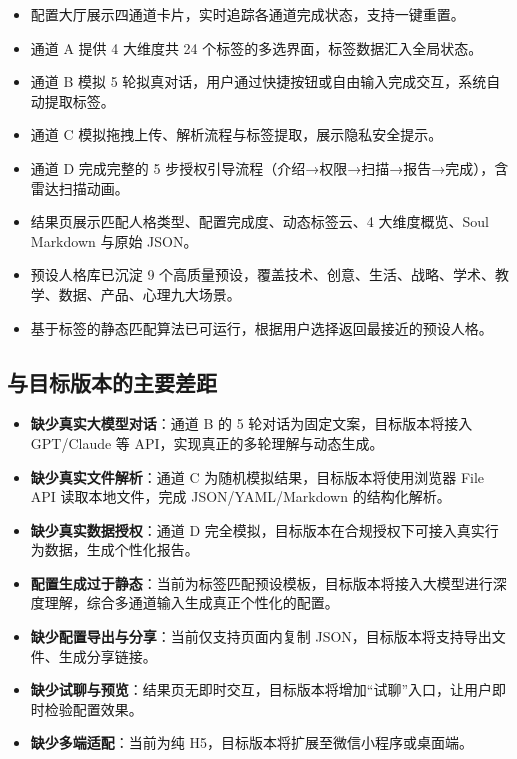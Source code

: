 \documentclass[11pt,a4paper]{ctexart}
\begin{document}
\begin{itemize}
  \item 配置大厅展示四通道卡片，实时追踪各通道完成状态，支持一键重置。
  \item 通道 A 提供 4 大维度共 24 个标签的多选界面，标签数据汇入全局状态。
  \item 通道 B 模拟 5 轮拟真对话，用户通过快捷按钮或自由输入完成交互，系统自动提取标签。
  \item 通道 C 模拟拖拽上传、解析流程与标签提取，展示隐私安全提示。
  \item 通道 D 完成完整的 5 步授权引导流程（介绍→权限→扫描→报告→完成），含雷达扫描动画。
  \item 结果页展示匹配人格类型、配置完成度、动态标签云、4 大维度概览、Soul Markdown 与原始 JSON。
  \item 预设人格库已沉淀 9 个高质量预设，覆盖技术、创意、生活、战略、学术、教学、数据、产品、心理九大场景。
  \item 基于标签的静态匹配算法已可运行，根据用户选择返回最接近的预设人格。
\end{itemize}

\subsection{与目标版本的主要差距}

\begin{itemize}
  \item \textbf{缺少真实大模型对话}：通道 B 的 5 轮对话为固定文案，目标版本将接入 GPT/Claude 等 API，实现真正的多轮理解与动态生成。
  \item \textbf{缺少真实文件解析}：通道 C 为随机模拟结果，目标版本将使用浏览器 File API 读取本地文件，完成 JSON/YAML/Markdown 的结构化解析。
  \item \textbf{缺少真实数据授权}：通道 D 完全模拟，目标版本在合规授权下可接入真实行为数据，生成个性化报告。
  \item \textbf{配置生成过于静态}：当前为标签匹配预设模板，目标版本将接入大模型进行深度理解，综合多通道输入生成真正个性化的配置。
  \item \textbf{缺少配置导出与分享}：当前仅支持页面内复制 JSON，目标版本将支持导出文件、生成分享链接。
  \item \textbf{缺少试聊与预览}：结果页无即时交互，目标版本将增加“试聊”入口，让用户即时检验配置效果。
  \item \textbf{缺少多端适配}：当前为纯 H5，目标版本将扩展至微信小程序或桌面端。
\end{itemize}
\end{document}
